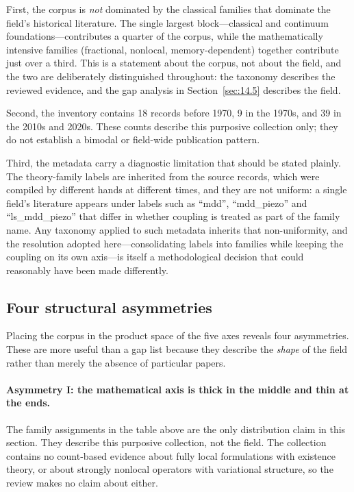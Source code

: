 First, the corpus is \emph{not} dominated by the classical families that dominate the field's historical literature. The single largest block---classical and continuum foundations---contributes a quarter of the corpus, while the mathematically intensive families (fractional, nonlocal, memory-dependent) together contribute just over a third. This is a statement about the corpus, not about the field, and the two are deliberately distinguished throughout: the taxonomy describes the reviewed evidence, and the gap analysis in Section~\ref{sec:14.5} describes the field.

Second, the inventory contains 18 records before 1970, 9 in the 1970s, and 39 in the 2010s and 2020s. These counts describe this purposive collection only; they do not establish a bimodal or field-wide publication pattern.

Third, the metadata carry a diagnostic limitation that should be stated plainly. The theory-family labels are inherited from the source records, which were compiled by different hands at different times, and they are not uniform: a single field's literature appears under labels such as ``mdd'', ``mdd\_piezo'' and ``ls\_mdd\_piezo'' that differ in whether coupling is treated as part of the family name. Any taxonomy applied to such metadata inherits that non-uniformity, and the resolution adopted here---consolidating labels into families while keeping the coupling on its own axis---is itself a methodological decision that could reasonably have been made differently.

\subsection{Four structural asymmetries}
\label{sec:14.4}

Placing the corpus in the product space of the five axes reveals four asymmetries. These are more useful than a gap list because they describe the \emph{shape} of the field rather than merely the absence of particular papers.

\paragraph{Asymmetry I: the mathematical axis is thick in the middle and thin at the ends.}
The family assignments in the table above are the only distribution claim in this section. They describe this purposive collection, not the field. The collection contains no count-based evidence about fully local formulations with existence theory, or about strongly nonlocal operators with variational structure, so the review makes no claim about either.

